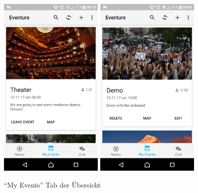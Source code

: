 \documentclass{scrartcl}
\begin{document}
\begin{figure}[h!tbp]
  \centering
  \includegraphics[width=5cm]{img/overview_myevents_1}
  \hspace{1cm}
  \includegraphics[width=5cm]{img/overview_myevents_2}
  \caption{\enquote{My Events} Tab der Übersicht}
\end{figure}
\end{document}
